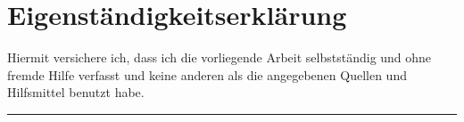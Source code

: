
\chapter*{Eigenständigkeitserklärung}

Hiermit versichere ich, dass ich die vorliegende Arbeit selbstständig und ohne fremde Hilfe verfasst und keine anderen als die angegebenen Quellen und Hilfsmittel benutzt habe.
\vspace{3cm}

\noindent{} \hspace{4cm} 
\hrule